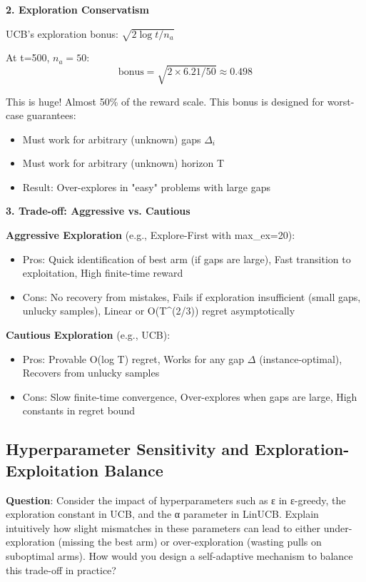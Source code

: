 \documentclass[12pt]{article}
\begin{document}
{{{\textbf{2. Exploration Conservatism}

UCB's exploration bonus: $\sqrt{2 \log t / n_a}$

At t=500, $n_a=50$:
\begin{equation}
\text{bonus} = \sqrt{2 \times 6.21 / 50} \approx 0.498
\end{equation}

This is huge! Almost 50\% of the reward scale. This bonus is designed for worst-case guarantees:
\begin{itemize}
\item Must work for arbitrary (unknown) gaps $\Delta_i$
\item Must work for arbitrary (unknown) horizon T
\item Result: Over-explores in "easy" problems with large gaps
\end{itemize}

\textbf{3. Trade-off: Aggressive vs. Cautious}

\textbf{Aggressive Exploration} (e.g., Explore-First with max_ex=20):
\begin{itemize}
\item Pros: Quick identification of best arm (if gaps are large), Fast transition to exploitation, High finite-time reward
\item Cons: No recovery from mistakes, Fails if exploration insufficient (small gaps, unlucky samples), Linear or O(T^(2/3)) regret asymptotically
\end{itemize}

\textbf{Cautious Exploration} (e.g., UCB):
\begin{itemize}
\item Pros: Provable O(log T) regret, Works for any gap $\Delta$ (instance-optimal), Recovers from unlucky samples
\item Cons: Slow finite-time convergence, Over-explores when gaps are large, High constants in regret bound
\end{itemize}

\subsection{Hyperparameter Sensitivity and Exploration-Exploitation Balance}

\textbf{Question}: Consider the impact of hyperparameters such as ε in ε-greedy, the exploration constant in UCB, and the α parameter in LinUCB. Explain intuitively how slight mismatches in these parameters can lead to either under-exploration (missing the best arm) or over-exploration (wasting pulls on suboptimal arms). How would you design a self-adaptive mechanism to balance this trade-off in practice?

}}}
\end{document}

